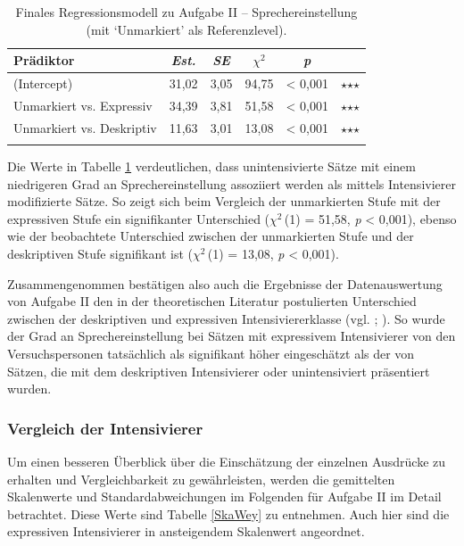 \begin{table}
\begin{tabularx}{\textwidth}{Xccccr}
\lsptoprule
Prädiktor & \textit{Est.} & \textit{SE} & \textit{$\chi$$^{2}$} & \textit{p} & \\
\midrule
(Intercept) & 31,02 & 3,05 & 94,75 & < 0,001 & $\star$$\star$$\star$\\
Unmarkiert vs. Expressiv & 34,39 & 3,81 & 51,58 & < 0,001 & $\star$$\star$$\star$ \\
Unmarkiert vs. Deskriptiv & 11,63 & 3,01 & 13,08 & < 0,001 & $\star$$\star$$\star$\\
\lspbottomrule
\end{tabularx}
\caption[Finales Regressionsmodell zu Aufgabe II von Experiment 1 (mit `Unmarkiert' als Referenzlevel)]{Finales Regressionsmodell zu Aufgabe II -- Sprechereinstellung (mit `Unmarkiert' als Referenzlevel).}
\label{LinReg0020}
\end{table}


\noindent Die Werte in Tabelle \ref{LinReg0020} verdeutlichen, dass unintensivierte Sätze mit einem niedrigeren Grad an Sprechereinstellung assoziiert werden als mittels Intensivierer modifizierte Sätze. So zeigt sich beim Vergleich der unmarkierten Stufe mit der expressiven Stufe ein signifikanter Unterschied ($\chi$$^{2}$\,(1) = 51,58, \textit{p} < 0,001), ebenso wie der beobachtete Unterschied zwischen der unmarkierten Stufe und der deskriptiven Stufe signifikant ist ($\chi$$^{2}$\,(1) = 13,08, {\textit{p} < 0,001}).


Zusammengenommen bestätigen also auch die Ergebnisse der Datenauswertung von Aufgabe II den in der theoretischen Literatur postulierten Unterschied zwischen der deskriptiven und expressiven Intensiviererklasse (vgl. {\citealt[315]{Lang.1983}}; \citealt[57]{Ortner.2014}). So wurde der Grad an Sprechereinstellung bei Sätzen mit expressivem Intensivierer von den Versuchspersonen tatsächlich als signifikant höher eingeschätzt als der von Sätzen, die mit dem deskriptiven Intensivierer oder unintensiviert präsentiert wurden.





\subsubsection{Vergleich der Intensivierer} \label{abs:I-Vergleich513}


Um einen besseren Überblick über die Einschätzung der einzelnen Ausdrücke zu erhalten und Vergleichbarkeit zu gewährleisten, werden die gemittelten Skalenwerte und Standardabweichungen im Folgenden für Aufgabe II im Detail betrachtet. Diese Werte sind {Tabelle \ref{SkaWey}} zu entnehmen. Auch hier sind die expressiven Intensivierer in ansteigendem Skalenwert angeordnet.





